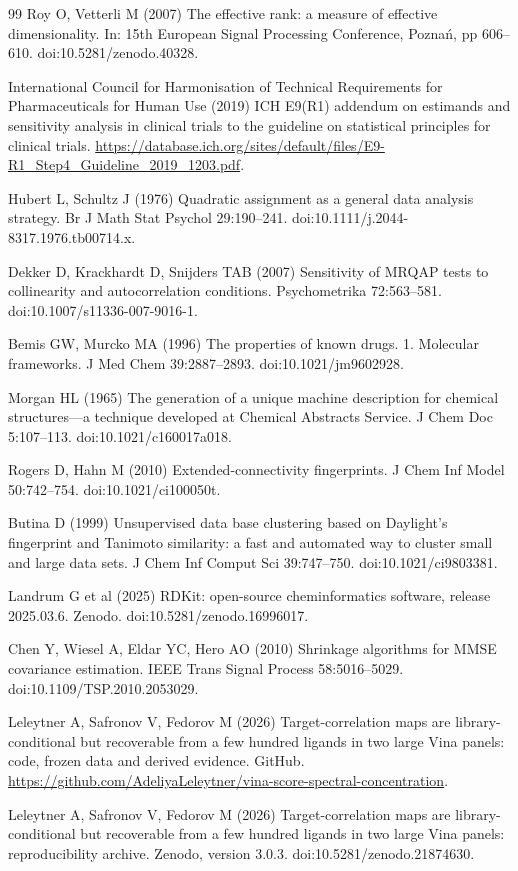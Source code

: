 \documentclass[11pt]{article}
\begin{document}
\begin{thebibliography}{99}
 Roy O, Vetterli M (2007) The effective rank: a measure of effective
dimensionality. In: 15th European Signal Processing Conference, Pozna\'n, pp 606--610.
doi:10.5281/zenodo.40328.

 International Council for Harmonisation of Technical Requirements
for Pharmaceuticals for Human Use (2019) ICH E9(R1) addendum on estimands and sensitivity
analysis in clinical trials to the guideline on statistical principles for clinical trials.
\url{https://database.ich.org/sites/default/files/E9-R1_Step4_Guideline_2019_1203.pdf}.

 Hubert L, Schultz J (1976) Quadratic assignment as a general data
analysis strategy. Br J Math Stat Psychol 29:190--241.
doi:10.1111/j.2044-8317.1976.tb00714.x.

 Dekker D, Krackhardt D, Snijders TAB (2007) Sensitivity of MRQAP
tests to collinearity and autocorrelation conditions. Psychometrika 72:563--581.
doi:10.1007/s11336-007-9016-1.

 Bemis GW, Murcko MA (1996) The properties of known drugs. 1.
Molecular frameworks. J Med Chem 39:2887--2893. doi:10.1021/jm9602928.

 Morgan HL (1965) The generation of a unique machine description for
chemical structures---a technique developed at Chemical Abstracts Service. J Chem Doc
5:107--113. doi:10.1021/c160017a018.

 Rogers D, Hahn M (2010) Extended-connectivity fingerprints.
J Chem Inf Model 50:742--754. doi:10.1021/ci100050t.

 Butina D (1999) Unsupervised data base clustering based on
Daylight's fingerprint and Tanimoto similarity: a fast and automated way to cluster small
and large data sets. J Chem Inf Comput Sci 39:747--750. doi:10.1021/ci9803381.

 Landrum G et al (2025) RDKit: open-source cheminformatics software,
release 2025.03.6. Zenodo. doi:10.5281/zenodo.16996017.

 Chen Y, Wiesel A, Eldar YC, Hero AO (2010) Shrinkage algorithms for
MMSE covariance estimation. IEEE Trans Signal Process 58:5016--5029.
doi:10.1109/TSP.2010.2053029.

 Leleytner A, Safronov V, Fedorov M (2026) Target-correlation maps
are library-conditional but recoverable from a few hundred ligands in two large Vina panels:
code, frozen data and derived
evidence. GitHub.
\url{https://github.com/AdeliyaLeleytner/vina-score-spectral-concentration}.

 Leleytner A, Safronov V, Fedorov M (2026) Target-correlation maps
are library-conditional but recoverable from a few hundred ligands in two large Vina panels:
reproducibility archive.
Zenodo, version 3.0.3. doi:10.5281/zenodo.21874630.

\end{thebibliography}
\end{document}
